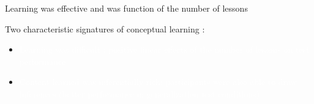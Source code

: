 \documentclass[11pt]{beamer}
\begin{document}
                    \begin{frame}


                      
                      
                     Learning was effective and was function of the number of lessons 
                     



                     Two characteristic signatures of conceptual learning :

                     \begin{itemize}

                       \item{\textcolor{white}{ Learning was difficult :  positive linear effects of the number of lessons on test performance}}


                         \item{\textcolor{white}{ Content learned was inferentially rich: participants  were also able to draw inferences (better performance in generalization test conditions)}}

                      \end{itemize}


                    \end{frame}
\end{document}
